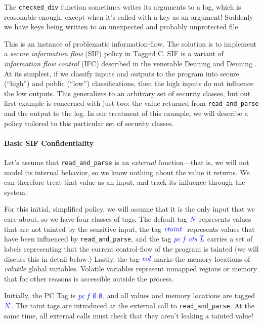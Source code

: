 \documentclass{llncs}
\begin{document}
The {\tt checked\_div} function sometimes writes its arguments to a log,
which is reasonable enough, except when it's called with a key as an argument!
Suddenly we have keys being written to an unexpected and probably unprotected file.

This is an instance of problematic information-flow. The solution is to implement
a {\em secure information flow} (SIF) policy in Tagged C. SIF is a variant of
{\em information flow control} (IFC) described in the venerable Denning and Denning
\cite{Denning77:SecureInformationFlow}. At its simplest, if we classify inputs and outputs to
the program into secure (``high'') and public (``low'') classifications, then the
high inputs do not influence the low outputs. This generalizes to an arbitrary set
of security classes, but out first example is concerned with just two: the value
returned from {\tt read\_and\_parse} and the output to the log.
In our treatment of this example, we will describe a policy tailored to this particular
set of security classes.

\paragraph*{Basic SIF Confidentiality}

Let's assume that {\tt read\_and\_parse} is an {\em external} function---that is, we will not
model its internal behavior, so we know nothing about the value it returns. We can therefore
treat that value as an input, and track its influence through the system.

For this initial, simplified policy, we will assume that it is the only input that we care about,
so we have four classes of tags. The default tag \({\color{blue} N}\) represents values that are not tainted
by the sensitive input, the tag \(\mathit{\color{blue} vtaint ~ }\) represents values that have been influenced by
{\tt read\_and\_parse}, and the tag \(\mathit{\color{blue} pc ~ f ~ ets ~ \overline{L}}\) carries a set of labels
representing that the current control-flow of the program is tainted (we will discuss this in detail
below.) Lastly, the tag \(\mathit{\color{blue} vol}\) marks the memory locations of {\em volatile} global variables.
Volatile variables represent mmapped regions or memory that for other reasons is accessible
outside the process.

Initially, the PC Tag is \(\mathit{\color{blue} pc ~ f ~ \emptyset ~ \emptyset}\), and all values and memory locations are
tagged \({\color{blue} N}\). The taint tags are introduced at the external call to {\tt read\_and\_parse}.
At the same time, all external calls must check that they aren't leaking a tainted value!
\end{document}
